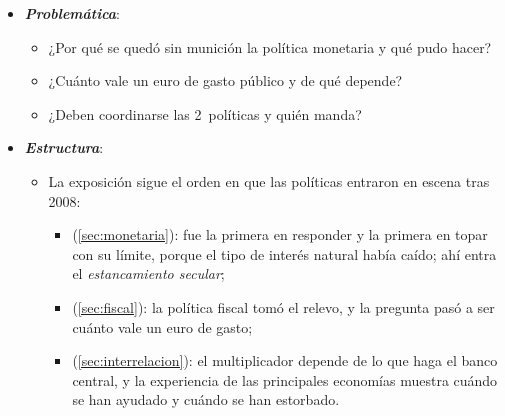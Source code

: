 \documentclass[11pt]{article}
\begin{document}
\begin{itemize}
\item \textbf{\emph{Problemática}}:
  \begin{itemize}
  \item ¿Por qué se quedó sin munición la política monetaria y qué pudo hacer?
  \item ¿Cuánto vale un euro de gasto público y de qué depende?
  \item ¿Deben coordinarse las 2~políticas y quién manda?
  \end{itemize}

\item \textbf{\emph{Estructura}}:
  \begin{itemize}
  \item La exposición sigue el orden en que las políticas entraron en escena tras 2008:
  \begin{itemize}
  \item {} (\ref{sec:monetaria}): fue la primera en responder y la primera en topar con su límite, porque el tipo de interés natural había caído; ahí entra el \emph{estancamiento secular};
  \item {} (\ref{sec:fiscal}): la política fiscal tomó el relevo, y la pregunta pasó a ser cuánto vale un euro de gasto;
  \item {} (\ref{sec:interrelacion}): el multiplicador depende de lo que haga el banco central, y la experiencia de las principales economías muestra cuándo se han ayudado y cuándo se han estorbado.
  \end{itemize}
  \end{itemize}
\end{itemize}
\end{document}
